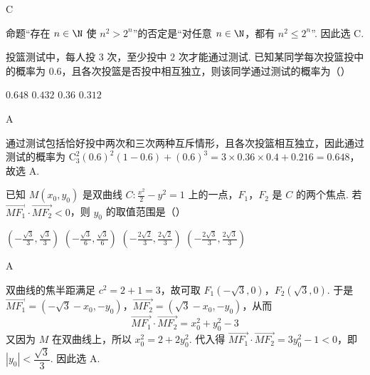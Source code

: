 \begin{answer}
C
\end{answer}

\begin{solution}
命题“存在 \(n\in\N\) 使 \(n^2>2^n\)”的否定是“对任意 \(n\in\N\)，都有 \(n^2\leqslant 2^n\)”. 因此选 C.
\end{solution}

\begin{problem}
投篮测试中，每人投 \(3\) 次，至少投中 \(2\) 次才能通过测试. 已知某同学每次投篮投中的概率为 \(0.6\)，且各次投篮是否投中相互独立，则该同学通过测试的概率为（\quad）

\choices
    {\(0.648\)}
    {\(0.432\)}
    {\(0.36\)}
    {\(0.312\)}
\end{problem}

\begin{answer}
A
\end{answer}

\begin{solution}
通过测试包括恰好投中两次和三次两种互斥情形，且各次投篮相互独立，因此通过测试的概率为
\(\mathrm C_3^2(0.6)^2(1-0.6)+(0.6)^3=3\times0.36\times0.4+0.216=0.648\)，故选 A.
\end{solution}

\begin{problem}
已知 \(M(x_0, y_0)\) 是双曲线 \(C: \frac{x^2}{2} - y^2 = 1\) 上的一点，\(F_1\)，\(F_2\) 是 \(C\) 的两个焦点. 若 \(\overrightarrow{MF_1} \cdot \overrightarrow{MF_2} < 0\)，则 \(y_0\) 的取值范围是（\quad）

\choices
    {\( \left(-\frac{\sqrt{3}}{3},\frac{\sqrt{3}}{3}\right) \)}
    {\( \left(-\frac{\sqrt{3}}{6},\frac{\sqrt{3}}{6}\right) \)}
    {\( \left(-\frac{2\sqrt{2}}{3},\frac{2\sqrt{2}}{3}\right) \)}
    {\( \left(-\frac{2\sqrt{3}}{3},\frac{2\sqrt{3}}{3}\right) \)}
\end{problem}

\begin{answer}
A
\end{answer}

\begin{solution}
双曲线的焦半距满足 \(c^2=2+1=3\)，故可取 \(F_1(-\sqrt3,0)\)，\(F_2(\sqrt3,0)\). 于是
\(\overrightarrow{MF_1}=(-\sqrt3-x_0,-y_0)\)，\(\overrightarrow{MF_2}=(\sqrt3-x_0,-y_0)\)，从而
\[
\overrightarrow{MF_1}\cdot\overrightarrow{MF_2}=x_0^2+y_0^2-3
\]
又因为 \(M\) 在双曲线上，所以 \(x_0^2=2+2y_0^2\). 代入得
\(\overrightarrow{MF_1}\cdot\overrightarrow{MF_2}=3y_0^2-1<0\)，即 \(|y_0|<\dfrac{\sqrt3}{3}\). 因此选 A.
\end{solution}

